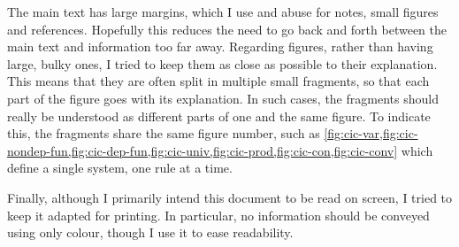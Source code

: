 The main text has large margins, which I use and abuse 
for notes, small figures and references. Hopefully this reduces the need to go
back and forth between the main text and information too far away.
Regarding figures, rather than having large, bulky ones,
I tried to keep them as close as possible to their explanation. This means that
they are often split in multiple small fragments,
so that each part of the figure goes with its
explanation. In such cases, the fragments should really be understood
as different parts of one and the same figure. To indicate this, the fragments share the same
figure number, such as
\cref{fig:cic-var,fig:cic-nondep-fun,fig:cic-dep-fun,fig:cic-univ,fig:cic-prod,fig:cic-con,fig:cic-conv} which define a single system, one rule at a time.

Finally, although I primarily intend this document to be read on screen, I tried to
keep it adapted for printing. In particular,
no information should be conveyed using only colour, though I use it to ease readability.

\endgroup


\cleardoubleevenemptypage


\begingroup %

\hypersetup{allcolors=.}

\setlength{\textheight}{230\vscale} %

\etocstandarddisplaystyle %
\etocstandardlines %
\setcounter{tocdepth}{\sectiontocdepth} %

\tableofcontents %

\setcounter{tocdepth}{\subsectiontocdepth} %




\endgroup
{}
